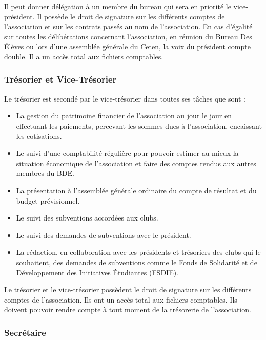 \documentclass{article} %
\begin{document}
				Il peut donner délégation à un membre du bureau qui sera en
				priorité le vice-président. Il possède le droit de signature sur
				les différents comptes de l'association et sur les contrats
				passés au nom de l’association. En cas d’égalité sur toutes les
				délibérations concernant l’association, en réunion du Bureau Des
				Élèves ou lors d’une assemblée générale du Ceten, la voix du
				président compte double. Il a un accès total aux fichiers
				comptables.

			\subsubsection{Trésorier et Vice-Trésorier}

				Le trésorier est secondé par le vice-trésorier dans toutes ses
				tâches que sont :
				\begin{itemize}
					\item La gestion du patrimoine financier de l’association au
						jour le jour en effectuant les paiements, percevant les
						sommes dues à l’association, encaissant les cotisations.
					\item Le suivi d’une comptabilité régulière pour pouvoir
						estimer au mieux la situation économique de
						l’association et faire des comptes rendus aux autres
						membres du BDE\@.
					\item La présentation à l’assemblée générale ordinaire du
						compte de résultat et du budget prévisionnel.
					\item Le suivi des subventions accordées aux clubs.
					\item Le suivi des demandes de subventions avec le
						président.
					\item La rédaction, en collaboration avec
						les présidents et trésoriers des clubs qui le
						souhaitent, des demandes de subventions comme le Fonds
						de Solidarité et de Développement des Initiatives
						Étudiantes (FSDIE).
				\end{itemize}

				Le trésorier et le vice-trésorier possèdent le droit de
				signature sur les différents comptes de
				l'association. Ils ont un accès
				total aux fichiers comptables. Ils doivent pouvoir rendre compte
				à tout moment de la trésorerie de l’association.

			\subsubsection{Secrétaire}
\end{document}
